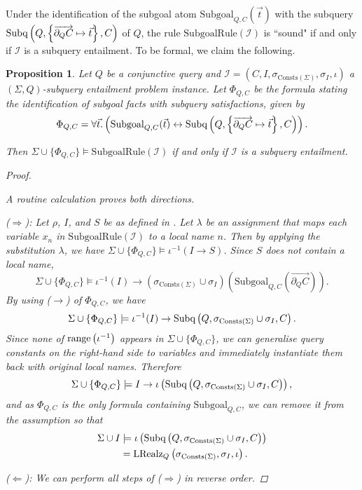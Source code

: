 \documentclass[12pt]{report}
\theoremstyle{plain}
\newtheorem{proposition}[theorem]{Proposition}
\theoremstyle{definition}
\def\Consts{{\mathrm{Consts}}}
\newcommand{\range}[1]{\ensuremath{\normalfont{\operatorname{range}} \left( #1 \right)}}
\newcommand{\Subq}[3]{\ensuremath{\normalfont{\textrm{Subq}} \left( #1, #2, #3 \right)}}
\newcommand{\LRealz}[2]{\ensuremath{\normalfont{\textrm{LRealz}}_{ #1 } \left( #2 \right)}}
\begin{document}
Under the identification of the subgoal atom $\mathrm{Subgoal}_{Q, C}(\vec{t})$ with the subquery $\Subq{Q}{\left\{ \overrightarrow{\partial_Q C} \mapsto \vec{t} \right\}}{C}$ of $Q$, the rule $\mathrm{SubgoalRule}(\mathcal{I})$ is ``sound" if and only if $\mathcal{I}$ is a subquery entailment. To be formal, we claim the following.

\begin{proposition}
\label{subgoal-captures-subquery-fulfilment}
  Let $Q$ be a conjunctive query and $\mathcal{I} = (C, I, \sigma_{\Consts(\Sigma)}, \sigma_I, \iota)$ a $(\Sigma, Q)$-subquery entailment problem instance. Let $\Phi_{Q, C}$ be the formula stating the identification of subgoal facts with subquery satisfactions, given by $$
    \Phi_{Q, C} = \forall \vec{t}. \left( \mathrm{Subgoal}_{Q,C}(\vec{t}) \leftrightarrow \Subq{Q}{\left\{ \overrightarrow{\partial_Q C} \mapsto \vec{t} \right\}}{C} \right).
  $$
  
  Then $\Sigma \cup \{ \Phi_{Q, C} \} \models \mathrm{SubgoalRule}(\mathcal{I})$ if and only if $\mathcal{I}$ is a subquery entailment.
  \begin{proof} $ $\par
    A routine calculation proves both directions.

    ($\Longrightarrow$):
      Let $\rho$, $I$, and $S$ be as defined in . Let $\lambda$ be an assignment that maps each variable $x_n$ in $\mathrm{SubgoalRule}(\mathcal{I})$ to a local name $n$. Then by applying the substitution $\lambda$, we have $\Sigma \cup \{ \Phi_{Q, C} \} \models \iota^{-1}(I \rightarrow S)$. Since $S$ does not contain a local name, $$
      \Sigma \cup \{ \Phi_{Q, C} \} \models \iota^{-1}(I) \rightarrow (\sigma_{\Consts(\Sigma)} \cup \sigma_I)\left(\mathrm{Subgoal}_{Q, C}\left(\overrightarrow{\partial_Q C}\right)\right).
      $$
      By using ($\rightarrow$) of $\Phi_{Q,C}$, we have
      $$
      \Sigma \cup \{ \Phi_{Q, C} \} \models \iota^{-1}(I) \rightarrow \Subq{Q}{\sigma_{\Consts(\Sigma)} \cup \sigma_I}{C}.
      $$
      Since none of $\range{\iota^{-1}}$ appears in $\Sigma \cup \{\Phi_{Q, C}\}$, we can generalise query constants on the right-hand side to variables and immediately instantiate them back with original local names. Therefore
      $$
      \Sigma \cup \{ \Phi_{Q, C} \} \models I \rightarrow \iota\left(\Subq{Q}{\sigma_{\Consts(\Sigma)} \cup \sigma_I}{C}\right),
      $$
      and as $\Phi_{Q, C}$ is the only formula containing $\mathrm{Subgoal}_{Q, C}$, we can remove it from the assumption so that \begin{align*}
        \Sigma \cup I
          &\models \iota\left(\Subq{Q}{\sigma_{\Consts(\Sigma)} \cup \sigma_I}{C}\right) \\
          &= \LRealz{Q}{\sigma_{\Consts(\Sigma)}, \sigma_I, \iota}.
      \end{align*}

    ($\Longleftarrow$): We can perform all steps of ($\Longrightarrow$) in reverse order.
  \end{proof}
\end{proposition}
\end{document}
